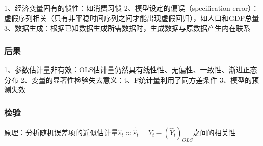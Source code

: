 \documentclass[12pt]{book}
\begin{document}
1、经济变量固有的惯性：如消费习惯  
2、模型设定的偏误（specification error）：虚假序列相关（只有非平稳时间序列之间才能出现虚假回归），如人口和GDP总量  
3、数据生成：根据已知数据生成所需数据时，生成数据与原数据产生内在联系

\subsubsection{后果}

1、参数估计量非有效：OLS估计量仍然具有线性性、无偏性、一致性、渐进正态分布  
2、变量的显著性检验失去意义：t、F统计量利用了同方差条件  
3、模型的预测失效

\subsubsection{检验}

原理：分析随机误差项的近似估计量${\hat{\varepsilon}}_t\approx\widetilde{{\hat{\varepsilon}}_t}=Y_t-\left({\hat{Y}}_t\right)_{OLS}$之间的相关性
\end{document}
